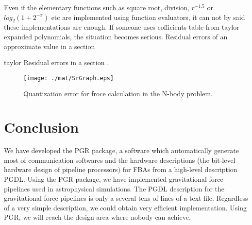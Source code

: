 \documentclass{llncs}
\begin{document}
Even if the elementary functions such as square root, division,
$r^{-1.5}$ or $log_{2}(1+2^{-x})$ etc are implemented using function
evaluators, it can not by said these implementations are enough.  If
someone uses cofficients table from taylor expanded polynomials, the
situation becomes serious. Residual errors of an approximate value in a section

taylor Residual errors in a section .

\begin{figure}[htb]
\begin{center}
\texttt{[image: ./mat/SrGraph.eps]}
\caption{Quantization error for froce calculation in the N-body problem.}
\label{SrError}
\end{center}
\end{figure}


\section{Conclusion}
We have developed the PGR package, a software which automatically generate
most of communication softwares and the hardware descriptions
(the bit-level hardware design of pipeline processors)
for FBAs from a high-level description PGDL.
Using the PGR package, we have implemented gravitational force
pipelines used in astrophysical simulations.
The PGDL description for the gravitational force pipelines
is only a several tens of lines of a text file.
Regardless of a very simple description, we could obtain very
efficient implementation. 
Using PGR, we will reach the design area where nobody can achieve.
\end{document}
